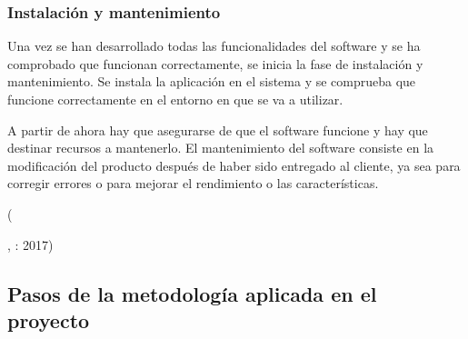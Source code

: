             \subsubsection{Instalación y mantenimiento
}
            \begin{center}
              \begin{minipage}{0.9\linewidth}
                \vspace{5pt}%
                {\small

                Una vez se han desarrollado todas las funcionalidades del software y se ha comprobado que funcionan correctamente, se inicia la fase de instalación y mantenimiento. Se instala la aplicación en el sistema y se comprueba que funcione correctamente en el entorno en que se va a utilizar.

                A partir de ahora hay que asegurarse de que el software funcione y hay que destinar recursos a mantenerlo. El mantenimiento del software consiste en la modificación del producto después de haber sido entregado al cliente, ya sea para corregir errores o para mejorar el rendimiento o las características.


                }
                \begin{flushright}
                  (\author{En qué consiste el modelo en cascada.},
                  : 2017)
                \end{flushright}
                  \vspace{5pt}%
              \end{minipage}
            \end{center}

    \subsection{Pasos de la metodología aplicada en el proyecto}
